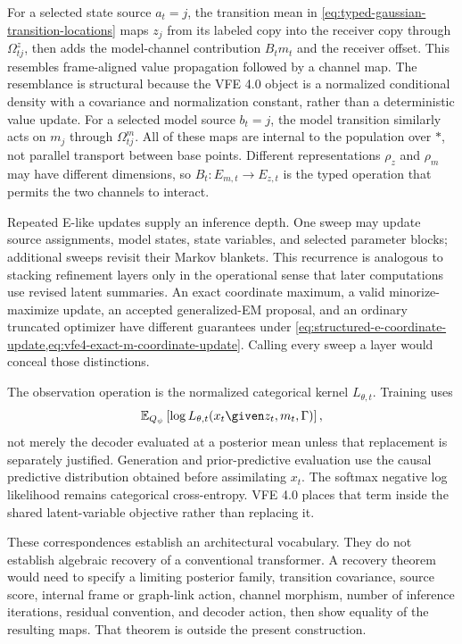 For a selected state source $a_t=j$, the transition mean in \cref{eq:typed-gaussian-transition-locations} maps $z_j$ from its labeled copy into the receiver copy through $\Omega^z_{tj}$, then adds the model-channel contribution $B_tm_t$ and the receiver offset. This resembles frame-aligned value propagation followed by a channel map. The resemblance is structural because the VFE 4.0 object is a normalized conditional density with a covariance and normalization constant, rather than a deterministic value update. For a selected model source $b_t=j$, the model transition similarly acts on $m_j$ through $\Omega^m_{tj}$. All of these maps are internal to the population over $\ast$, not parallel transport between base points. Different representations $\rho_z$ and $\rho_m$ may have different dimensions, so $B_t:E_{m,t}\to E_{z,t}$ is the typed operation that permits the two channels to interact.

Repeated E-like updates supply an inference depth. One sweep may update source assignments, model states, state variables, and selected parameter blocks; additional sweeps revisit their Markov blankets. This recurrence is analogous to stacking refinement layers only in the operational sense that later computations use revised latent summaries. An exact coordinate maximum, a valid minorize-maximize update, an accepted generalized-EM proposal, and an ordinary truncated optimizer have different guarantees under \cref{eq:structured-e-coordinate-update,eq:vfe4-exact-m-coordinate-update}. Calling every sweep a layer would conceal those distinctions.

The observation operation is the normalized categorical kernel $L_{\theta,t}$. Training uses
\begin{equation}
\mathbb E_{Q_\psi}
\left[
\log L_{\theta,t}(x_t\given z_t,m_t,\Gamma)
\right],
\label{eq:expected-categorical-transformer-readout}
\end{equation}
not merely the decoder evaluated at a posterior mean unless that replacement is separately justified. Generation and prior-predictive evaluation use the causal predictive distribution obtained before assimilating $x_t$. The softmax negative log likelihood remains categorical cross-entropy. VFE 4.0 places that term inside the shared latent-variable objective rather than replacing it.

These correspondences establish an architectural vocabulary. They do not establish algebraic recovery of a conventional transformer. A recovery theorem would need to specify a limiting posterior family, transition covariance, source score, internal frame or graph-link action, channel morphism, number of inference iterations, residual convention, and decoder action, then show equality of the resulting maps. That theorem is outside the present construction.

